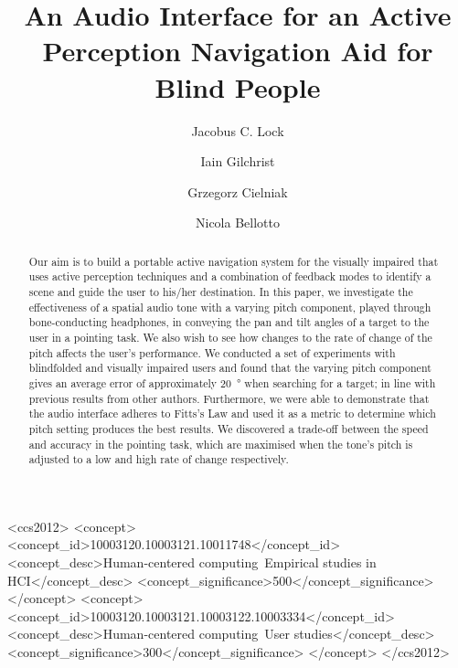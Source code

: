 \documentclass[sigconf, review=true, screen=true, anonymous=true]{acmart}
\begin{document}
\title{An Audio Interface for an Active Perception Navigation Aid for Blind People}

\author{Jacobus C. Lock}

\author{Iain Gilchrist}

\author{Grzegorz Cielniak}

\author{Nicola Bellotto}

\begin{abstract}
	Our aim is to build a portable active navigation system for the visually impaired that uses active perception techniques and a combination of feedback modes to identify a scene and guide the user to his/her destination.
	In this paper, we investigate the effectiveness of a spatial audio tone with a varying pitch component, played through bone-conducting headphones, in conveying the pan and tilt angles of a target to the user in a pointing task.
	We also wish to see how changes to the rate of change of the pitch affects the user's performance.
	We conducted a set of experiments with blindfolded and visually impaired users and found that the varying pitch component gives an average error of approximately \SI{20}{\degree} when searching for a target; in line with previous results from other authors.
	Furthermore, we were able to demonstrate that the audio interface adheres to Fitts's Law and used it as a metric to determine which pitch setting produces the best results.
	We discovered a trade-off between the speed and accuracy in the pointing task, which are maximised when the tone's pitch is adjusted to a low and high rate of change respectively. 
\end{abstract}

 \begin{CCSXML}
<ccs2012>
<concept>
<concept_id>10003120.10003121.10011748</concept_id>
<concept_desc>Human-centered computing~Empirical studies in HCI</concept_desc>
<concept_significance>500</concept_significance>
</concept>
<concept>
<concept_id>10003120.10003121.10003122.10003334</concept_id>
<concept_desc>Human-centered computing~User studies</concept_desc>
<concept_significance>300</concept_significance>
</concept>
</ccs2012>
\end{CCSXML}
\end{document}
